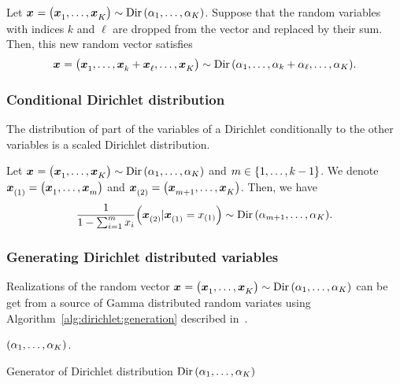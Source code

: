 \begin{prop}\label{prop:dirichlet:aggregation}
  Let $\va x=\bracket{\va x_1,\ldots,\va x_K}\sim \Dir\bracket{\alpha_1,\ldots,\alpha_K}$.
  Suppose that the random variables with indices $k$ and $\ell$ are dropped from the vector and replaced by their sum.
  Then, this new random vector satisfies
  \begin{equation}
    \va x=\bracket{\va x_1,\ldots,\va x_k+\va x_{\ell},\ldots,\va x_K}\sim \Dir\bracket{\alpha_1,\ldots,\alpha_k+\alpha_{\ell},\ldots,\alpha_K}.
  \end{equation}
\end{prop}


\subsubsection{Conditional Dirichlet distribution}


The distribution of part of the variables of a Dirichlet conditionally to the other variables is a scaled Dirichlet distribution.


\begin{prop}\label{prop:dirichlet:conditional}
  Let $\va x=\bracket{\va x_1,\ldots,\va x_K}\sim \Dir\bracket{\alpha_1,\ldots,\alpha_K}$ and $m\in\range[1]{k-1}$.
  We denote $\va x_{(1)}=\bracket{\va x_1,\ldots,\va x_m}$ and $\va x_{(2)}=\bracket{\va x_{m+1},\ldots,\va x_K}$.
  Then, we have
  \begin{equation}
    \frac{1}{1-\sum_{i=1}^m x_i} \bracket{\va x_{(2)}|\va x_{(1)}=x_{(1)}}
    \sim
    \Dir\bracket{\alpha_{m+1},\ldots,\alpha_K}.
  \end{equation}
\end{prop}


\subsubsection{Generating Dirichlet distributed variables}


Realizations of the random vector $\va x=\bracket{\va x_1,\ldots,\va x_K}\sim\Dir\bracket{\alpha_1,\ldots,\alpha_K}$ can be get from a source of Gamma distributed random variates using Algorithm~\ref{alg:dirichlet:generation} described in~\citet{Frigyik2010}.


\begin{algorithm}


\BlankLine






\BlankLine


\Return $\bracket{\alpha_1,\ldots,\alpha_K}$.\;


\BlankLine
\caption{Generator of Dirichlet distribution $\Dir\bracket{\alpha_1,\ldots,\alpha_K}$}
\label{alg:dirichlet:generation}
\end{algorithm}


